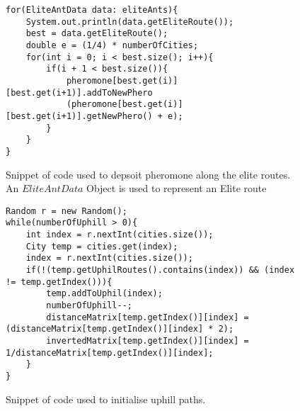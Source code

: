 \begin{figure}[H]
\begin{lstlisting}
for(EliteAntData data: eliteAnts){
	System.out.println(data.getEliteRoute());
	best = data.getEliteRoute();
	double e = (1/4) * numberOfCities;
	for(int i = 0; i < best.size(); i++){
		if(i + 1 < best.size()){
			pheromone[best.get(i)][best.get(i+1)].addToNewPhero
			(pheromone[best.get(i)][best.get(i+1)].getNewPhero() + e);
		}
	}
}
\end{lstlisting}
\caption{Snippet of code used to depsoit pheromone along the elite routes. An $EliteAntData$ Object is used to represent an Elite route}
\label{elitePhero}
\end{figure}

\begin{figure}[H]
\begin{lstlisting}
Random r = new Random();
while(numberOfUphill > 0){
	int index = r.nextInt(cities.size());
	City temp = cities.get(index);
	index = r.nextInt(cities.size());
	if(!(temp.getUphilRoutes().contains(index)) && (index != temp.getIndex())){
		temp.addToUphil(index);
		numberOfUphill--;
		distanceMatrix[temp.getIndex()][index] = (distanceMatrix[temp.getIndex()][index] * 2);
		invertedMatrix[temp.getIndex()][index] = 1/distanceMatrix[temp.getIndex()][index];
	}
}
\end{lstlisting}
\caption{Snippet of code used to initialise uphill paths.}
\label{suchUphill}
\end{figure}

